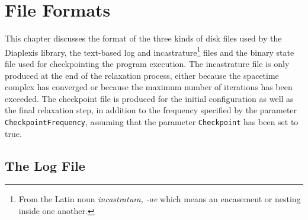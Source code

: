 \documentclass[12pt,letterpaper]{report}
\begin{document}
\chapter{File Formats}

This chapter discusses the format of the three kinds of disk files used by the Diaplexis library, the 
text-based log and incastrature\footnote{From the Latin noun \emph{incastratura, -ae} which means an 
encasement or nesting inside one another.} files and the binary state file used for checkpointing the 
program execution. The incastrature file is only produced at the end of the relaxation process, either 
because the spacetime complex has converged or because the maximum number of iterations has been exceeded. 
The checkpoint file is produced for the initial configuration as well as the final relaxation step, in 
addition to the frequency specified by the parameter \texttt{CheckpointFrequency}, assuming that the 
parameter \texttt{Checkpoint} has been set to true. 

\section{The Log File}
\end{document}
